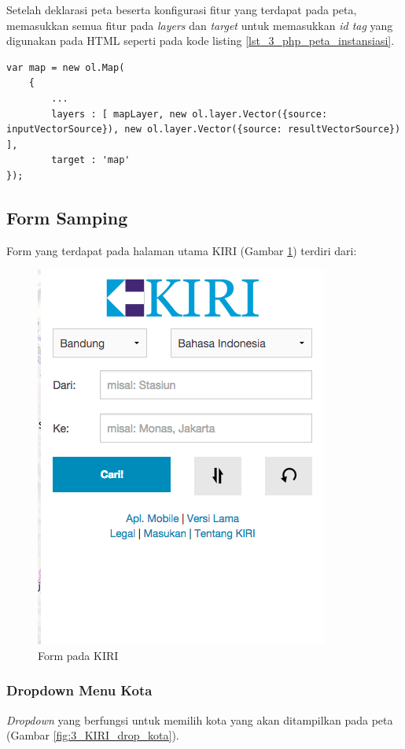 Setelah deklarasi peta beserta konfigurasi fitur yang terdapat pada peta, memasukkan semua fitur pada \textit{layers} dan \textit{target} untuk memasukkan \textit{id tag} yang digunakan pada HTML seperti pada kode listing \ref{lst_3_php_peta_instansiasi}.

\begin{lstlisting}[caption=Instansiasi peta,label = {lst_3_php_peta_instansiasi}]
var map = new ol.Map(
	{
		...
		layers : [ mapLayer, new ol.layer.Vector({source: inputVectorSource}), new ol.layer.Vector({source: resultVectorSource}) ],
		target : 'map'
});
\end{lstlisting}

\subsection{Form Samping}
Form yang terdapat pada halaman utama KIRI (Gambar \ref{fig:3_KIRI_form}) terdiri dari:
\begin{figure}[H]
	\centering
	\includegraphics[scale=0.5]{Gambar/KIRI-form}
	\caption{Form pada KIRI} 
	\label{fig:3_KIRI_form}
\end{figure}

\subsubsection{Dropdown Menu Kota}
\textit{Dropdown} yang berfungsi untuk memilih kota yang akan ditampilkan pada peta (Gambar \ref{fig:3_KIRI_drop_kota}).

